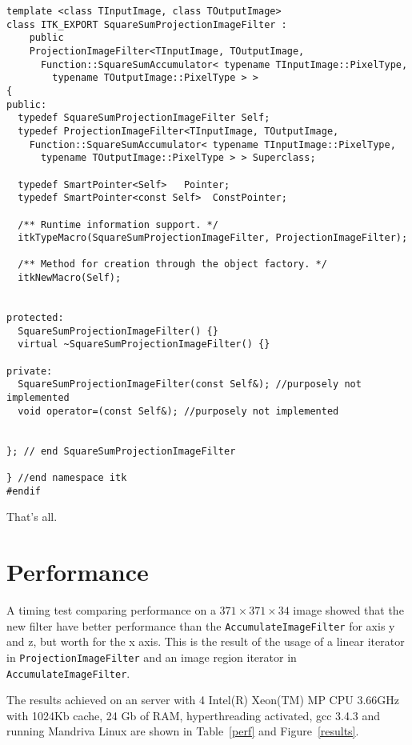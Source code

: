 \documentclass{InsightArticle}
\begin{document}
\small \begin{verbatim}
template <class TInputImage, class TOutputImage>
class ITK_EXPORT SquareSumProjectionImageFilter :
    public
    ProjectionImageFilter<TInputImage, TOutputImage,
      Function::SquareSumAccumulator< typename TInputImage::PixelType,
        typename TOutputImage::PixelType > >
{
public:
  typedef SquareSumProjectionImageFilter Self;
  typedef ProjectionImageFilter<TInputImage, TOutputImage, 
    Function::SquareSumAccumulator< typename TInputImage::PixelType,
      typename TOutputImage::PixelType > > Superclass;

  typedef SmartPointer<Self>   Pointer;
  typedef SmartPointer<const Self>  ConstPointer;

  /** Runtime information support. */
  itkTypeMacro(SquareSumProjectionImageFilter, ProjectionImageFilter);

  /** Method for creation through the object factory. */
  itkNewMacro(Self);


protected:
  SquareSumProjectionImageFilter() {}
  virtual ~SquareSumProjectionImageFilter() {}

private:
  SquareSumProjectionImageFilter(const Self&); //purposely not implemented
  void operator=(const Self&); //purposely not implemented


}; // end SquareSumProjectionImageFilter

} //end namespace itk
#endif
\end{verbatim} \normalsize
That's all.

\section{Performance}

A timing test comparing performance on a $371 \times 371 \times 34$
image showed that the new filter have better performance than the
\verb$AccumulateImageFilter$ for axis y and z, but worth for the x
axis. This is the result of the usage of a linear iterator in
\verb$ProjectionImageFilter$ and an image region iterator in
\verb$AccumulateImageFilter$.

 The results achieved on an server with 4 Intel(R) Xeon(TM) MP CPU 3.66GHz
with 1024Kb cache, 24 Gb of RAM, hyperthreading activated, gcc
3.4.3 and running Mandriva Linux are shown in Table~\ref{perf} and
Figure~\ref{results}.
\end{document}
